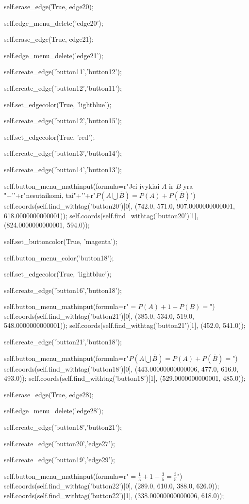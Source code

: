 self.erase_edge(True, edge20);

self.edge_menu_delete('edge20');

self.erase_edge(True, edge21);

self.edge_menu_delete('edge21');

self.create_edge('button11','button12');

self.create_edge('button12','button11');

self.set_edgecolor(True, 'lightblue');

self.create_edge('button12','button15');

self.set_edgecolor(True, 'red');

self.create_edge('button13','button14');

self.create_edge('button14','button13');

self.button_menu_mathinput(formula=r"Jei įvykiai $A$ ir $B$ yra "+'\n'+r"nesutaikomi, tai"+'\n'+r"$P(A\bigcup \overline{B})=P(A)+P(\overline{B})$")
self.coords(self.find_withtag('button20')[0], (742.0, 571.0, 907.0000000000001, 618.0000000000001));
self.coords(self.find_withtag('button20')[1], (824.0000000000001, 594.0));

self.set_buttoncolor(True, 'magenta');


self.button_menu_color('button18');

self.set_edgecolor(True, 'lightblue');

self.create_edge('button16','button18');


self.button_menu_mathinput(formula=r"$=P(A)+1-P(B)=$")
self.coords(self.find_withtag('button21')[0], (385.0, 534.0, 519.0, 548.0000000000001));
self.coords(self.find_withtag('button21')[1], (452.0, 541.0));

self.create_edge('button21','button18');

self.button_menu_mathinput(formula=r"$P(A\bigcup \overline{B})=P(A)+P(\overline{B})=$")
self.coords(self.find_withtag('button18')[0], (443.00000000000006, 477.0, 616.0, 493.0));
self.coords(self.find_withtag('button18')[1], (529.0000000000001, 485.0));

self.erase_edge(True, edge28);

self.edge_menu_delete('edge28');

self.create_edge('button18','button21');

self.create_edge('button20','edge27');

self.create_edge('button19','edge29');


self.button_menu_mathinput(formula=r"$=\frac{1}{5}+1-\frac{3}{5}=\frac{3}{5}$")
self.coords(self.find_withtag('button22')[0], (289.0, 610.0, 388.0, 626.0));
self.coords(self.find_withtag('button22')[1], (338.00000000000006, 618.0));

